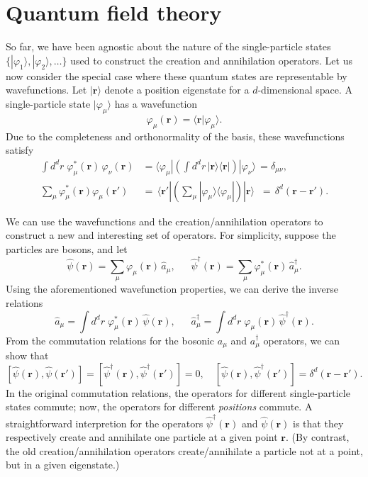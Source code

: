 \documentclass[pra,12pt]{revtex4}
\begin{document}
\section{Quantum field theory}
\label{sec:qft}

So far, we have been agnostic about the nature of the single-particle
states $\{|\varphi_1\rangle,|\varphi_2\rangle,\dots\}$ used to
construct the creation and annihilation operators.  Let us now
consider the special case where these quantum states are representable
by wavefunctions.  Let $|\mathbf{r}\rangle$ denote a position
eigenstate for a $d$-dimensional space.  A single-particle state
$|\varphi_\mu\rangle$ has a wavefunction
$$\varphi_\mu(\mathbf{r}) = \langle\mathbf{r}|\varphi_\mu\rangle.$$
Due to the completeness and orthonormality of the basis, these
wavefunctions satisfy
$$\begin{aligned}\int d^dr \; \varphi_\mu^*(\mathbf{r})\, \varphi_\nu(\mathbf{r}) &= \langle\varphi_\mu| \left(\int d^dr\, |\mathbf{r}\rangle\langle\mathbf{r}|\right) |\varphi_\nu\rangle \,= \delta_{\mu\nu}, \\\sum_\mu \varphi_\mu^*(\mathbf{r}) \varphi_\mu(\mathbf{r}') &=\, \langle \mathbf{r}'| \left(\sum_\mu |\varphi_\mu\rangle\langle\varphi_\mu|\right)|\mathbf{r}\rangle \;\;=\, \delta^d(\mathbf{r}-\mathbf{r}').\end{aligned}$$

We can use the wavefunctions and the creation/annihilation operators
to construct a new and interesting set of operators.  For simplicity,
suppose the particles are bosons, and let
$$\hat{\psi}(\mathbf{r}) = \sum_\mu \varphi_\mu(\mathbf{r}) \, \hat{a}_\mu, \quad\;\; \hat{\psi}^\dagger(\mathbf{r}) = \sum_\mu \varphi_\mu^*(\mathbf{r}) \, \hat{a}_\mu^\dagger.$$
Using the aforementioned wavefunction properties, we can derive the
inverse relations
$$\hat{a}_\mu = \int d^dr \; \varphi_\mu^*(\mathbf{r}) \, \hat{\psi}(\mathbf{r}), \quad\;\; \hat{a}_\mu^\dagger = \int d^dr \; \varphi_\mu(\mathbf{r}) \, \hat{\psi}^\dagger(\mathbf{r}).$$
From the commutation relations for the bosonic $a_\mu$ and
$a_\mu^\dagger$ operators, we can show that
$$\left[\hat{\psi}(\mathbf{r}), \hat{\psi}(\mathbf{r}')\right] = \left[\hat{\psi}^\dagger(\mathbf{r}), \hat{\psi}^\dagger(\mathbf{r}')\right] = 0, \quad \left[\hat{\psi}(\mathbf{r}), \hat{\psi}^\dagger(\mathbf{r}')\right] = \delta^d(\mathbf{r}-\mathbf{r}').$$
In the original commutation relations, the operators for different
single-particle states commute; now, the operators for different
\textit{positions} commute.  A straightforward interpretion for the
operators $\hat{\psi}^\dagger(\mathbf{r})$ and
$\hat{\psi}(\mathbf{r})$ is that they respectively create and
annihilate one particle at a given point $\mathbf{r}$.  (By contrast,
the old creation/annihilation operators create/annihilate a particle
not at a point, but in a given eigenstate.)
\end{document}
